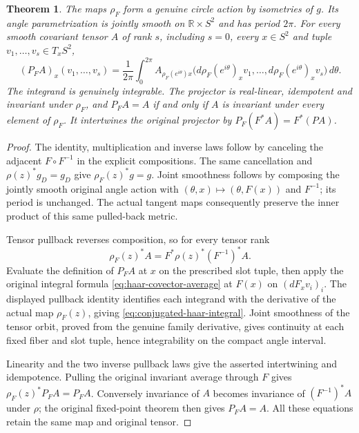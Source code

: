 \documentclass[11pt]{article}
\newtheorem{theorem}{Theorem}[section]
\newcommand{\R}{\mathbb R}
\begin{document}
\begin{theorem}\label{thm:conjugated-haar-projector}
The maps $\rho_F$ form a genuine circle action by isometries of $g$.
Its angle parametrization is jointly smooth on $\R\times S^2$ and has period
$2\pi$. For every smooth covariant tensor $A$ of rank $s$, including $s=0$,
every $x\in S^2$ and tuple $v_1,\ldots,v_s\in T_xS^2$,
\begin{equation}\label{eq:conjugated-haar-integral}
 (P_FA)_x(v_1,\ldots,v_s)=\frac1{2\pi}\int_0^{2\pi}
 A_{\rho_F(e^{i\theta})x}
 \bigl(d\rho_F(e^{i\theta})_xv_1,\ldots,
       d\rho_F(e^{i\theta})_xv_s\bigr)\,d\theta .
\end{equation}
The integrand is genuinely integrable. The projector is real-linear,
idempotent and invariant under $\rho_F$, and
$P_FA=A$ if and only if $A$ is invariant under every element of $\rho_F$.
It intertwines the original projector by $P_F(F^*A)=F^*(PA)$.
\end{theorem}

\begin{proof}
The identity, multiplication and inverse laws follow by canceling the
adjacent $F\circ F^{-1}$ in the explicit compositions.
The same cancellation and $\rho(z)^*g_D=g_D$ give
$\rho_F(z)^*g=g$. Joint smoothness follows by composing the jointly smooth
original angle action with $(\theta,x)\mapsto(\theta,F(x))$ and $F^{-1}$;
its period is unchanged. The actual tangent maps consequently preserve
the inner product of this same pulled-back metric.

Tensor pullback reverses composition, so for every tensor rank
\[
 \rho_F(z)^*A=F^*\rho(z)^*(F^{-1})^*A.
\]
Evaluate the definition of $P_FA$ at $x$ on the prescribed slot tuple,
then apply the original integral formula \eqref{eq:haar-covector-average}
at $F(x)$ on $(dF_xv_i)_i$. The displayed pullback identity identifies
each integrand with the derivative of the actual map $\rho_F(z)$, giving
\eqref{eq:conjugated-haar-integral}. Joint smoothness of the tensor orbit,
proved from the genuine family derivative, gives continuity at each fixed
fiber and slot tuple, hence integrability on the compact angle interval.

Linearity and the two inverse pullback laws give the asserted intertwining
and idempotence. Pulling the original invariant average through $F$ gives
$\rho_F(z)^*P_FA=P_FA$. Conversely invariance of $A$ becomes invariance
of $(F^{-1})^*A$ under $\rho$; the original fixed-point theorem then gives
$P_FA=A$. All these equations retain the same map and original tensor.
\end{proof}
\end{document}
